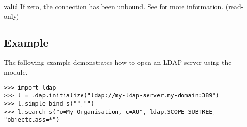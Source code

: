 \begin{memberdesc}[LDAP]{valid} %
    If zero, the connection has been unbound. See  for
    more information.
    (read-only)
\end{memberdesc}



\subsection{Example \label{ldap-example}}

The following example demonstrates how to open an LDAP server using the
 module.

\begin{verbatim}
>>> import ldap
>>> l = ldap.initialize("ldap://my-ldap-server.my-domain:389")
>>> l.simple_bind_s("","")
>>> l.search_s("o=My Organisation, c=AU", ldap.SCOPE_SUBTREE, "objectclass=*")
\end{verbatim}


